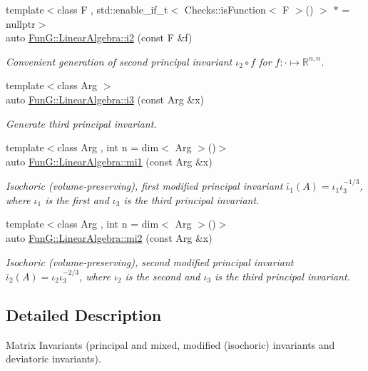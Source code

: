 \begin{DoxyCompactItemize}
{\footnotesize template$<$class F , std\+::enable\+\_\+if\+\_\+t$<$ Checks\+::is\+Function$<$ F $>$() $>$ $\ast$  = nullptr$>$ }\\auto \hyperlink{group__InvariantGroup_gad3987f97353c8696e602ed1915b3cf47}{Fun\+G\+::\+Linear\+Algebra\+::i2} (const F \&f)
\begin{DoxyCompactList}\small\item\em Convenient generation of second principal invariant $ \iota_2\circ f $ for $f:\cdot\mapsto\mathbb{R}^{n,n}$. \end{DoxyCompactList}\item 
{\footnotesize template$<$class Arg $>$ }\\auto \hyperlink{group__InvariantGroup_gae1ad80b4b2f34a10564114fad28bc313}{Fun\+G\+::\+Linear\+Algebra\+::i3} (const Arg \&x)
\begin{DoxyCompactList}\small\item\em Generate third principal invariant. \end{DoxyCompactList}\item 
{\footnotesize template$<$class Arg , int n = dim$<$ Arg $>$()$>$ }\\auto \hyperlink{group__InvariantGroup_ga7eed5e2661171d81e192ac1db791244c}{Fun\+G\+::\+Linear\+Algebra\+::mi1} (const Arg \&x)
\begin{DoxyCompactList}\small\item\em Isochoric (volume-\/preserving), first modified principal invariant $ \bar\iota_1(A)=\iota_1\iota_3^{-1/3} $, where $\iota_1$ is the first and $\iota_3$ is the third principal invariant. \end{DoxyCompactList}\item 
{\footnotesize template$<$class Arg , int n = dim$<$ Arg $>$()$>$ }\\auto \hyperlink{group__InvariantGroup_ga9d219c5c48cce1d3af60345916963524}{Fun\+G\+::\+Linear\+Algebra\+::mi2} (const Arg \&x)
\begin{DoxyCompactList}\small\item\em Isochoric (volume-\/preserving), second modified principal invariant $ \bar\iota_2(A)=\iota_2\iota_3^{-2/3} $, where $\iota_2$ is the second and $\iota_3$ is the third principal invariant. \end{DoxyCompactList}\end{DoxyCompactItemize}


\subsection{Detailed Description}
Matrix Invariants (principal and mixed, modified (isochoric) invariants and deviatoric invariants). 



